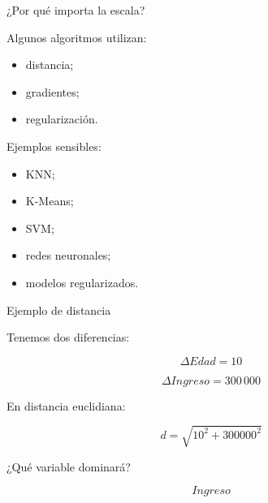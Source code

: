 \documentclass[aspectratio=169,11pt]{beamer}
\begin{document}

\begin{frame}{¿Por qué importa la escala?}

Algunos algoritmos utilizan:

\begin{itemize}

    \item distancia;

    \item gradientes;

    \item regularización.

\end{itemize}

Ejemplos sensibles:

\begin{itemize}

    \item KNN;

    \item K-Means;

    \item SVM;

    \item redes neuronales;

    \item modelos regularizados.

\end{itemize}

\end{frame}


\begin{frame}{Ejemplo de distancia}

Tenemos dos diferencias:

\[
\Delta Edad=10
\]

\[
\Delta Ingreso=300\,000
\]

En distancia euclidiana:

\[
d
=
\sqrt{
10^2
+
300000^2
}
\]

\vspace{0.4cm}

¿Qué variable dominará?

\[
\boxed{Ingreso}
\]

\end{frame}

\end{document}
